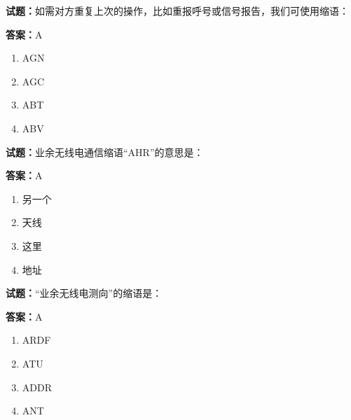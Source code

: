 \documentclass{ctexbook}
\begin{document}




\vspace{1em}

\textbf{试题：}如需对方重复上次的操作，比如重报呼号或信号报告，我们可使用缩语： 

\textbf{答案：}A 

\begin{enumerate}[leftmargin=3em]
  \item AGN 

  \item AGC 

  \item ABT 

  \item ABV 

\end{enumerate}





\vspace{1em}

\textbf{试题：}业余无线电通信缩语“AHR”的意思是： 

\textbf{答案：}A 

\begin{enumerate}[leftmargin=3em]
  \item 另一个 

  \item 天线 

  \item 这里 

  \item 地址 

\end{enumerate}





\vspace{1em}

\textbf{试题：}“业余无线电测向”的缩语是： 

\textbf{答案：}A 

\begin{enumerate}[leftmargin=3em]
  \item ARDF 

  \item ATU 

  \item ADDR 

  \item ANT 

\end{enumerate}
\end{document}
